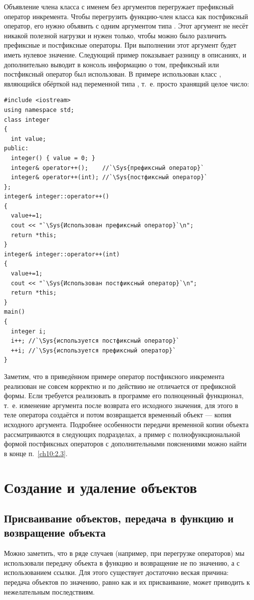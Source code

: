 Объявление члена класса с именем  без аргументов перегружает префиксный оператор
инкремента. Чтобы перегрузить функцию-член класса как постфиксный оператор, его нужно объявить с одним аргументом типа
. Этот аргумент не несёт никакой полезной нагрузки и нужен только, чтобы можно было различить
префиксные и постфиксные операторы. При выполнении этот аргумент будет иметь нулевое значение. Следующий пример
показывает разницу в описаниях, и дополнительно выводит в консоль информацию о том, префиксный или постфиксный оператор
был использован. В примере использован класс , являющийся обёрткой над переменной типа
, т.~е. просто хранящий целое число:
\begin{lstlisting}
#include <iostream>
using namespace std;
class integer 
{
  int value;
public:
  integer() { value = 0; }
  integer& operator++();    //`\Sys{префиксный оператор}`
  integer& operator++(int); //`\Sys{постфиксный оператор}`
};
integer& integer::operator++() 
{
  value+=1;
  cout << "`\Sys{Использован префиксный оператор}`\n";
  return *this;
} 
integer& integer::operator++(int) 
{
  value+=1;
  cout << "`\Sys{Использован постфиксный оператор}`\n";
  return *this;
} 
main() 
{
  integer i;
  i++; //`\Sys{используется постфиксный оператор}`
  ++i; //`\Sys{используется префиксный оператор}` 
}
\end{lstlisting}

Заметим, что в приведённом примере оператор постфиксного инкремента реализован не совсем корректно и по действию не
отличается от префиксной формы. Если требуется реализовать в программе его полноценный функционал, т.~е. изменение
аргумента после возврата его исходного значения, для этого в теле оператора создаётся и потом возвращается временный
объект --- копия исходного аргумента. Подробнее особенности передачи временной копии объекта рассматриваются в следующих
подразделах, а пример с полнофункциональной формой постфиксных операторов с дополнительными пояснениями можно найти в
конце п.~\ref{ch10:2.3}.

\section[Создание и удаление объектов]{Создание и удаление объектов}
\subsection[Присваивание объектов, передача в функцию и возвращение объекта]{Присваивание объектов, передача в
функцию и возвращение объекта}
Можно заметить, что в ряде случаев (например, при перегрузке операторов) мы использовали передачу объекта в функцию и
возвращение не по значению, а с использованием ссылки. Для этого существует достаточно веская причина: передача
объектов по значению, равно как и их присваивание, может приводить к нежелательным последствиям.

